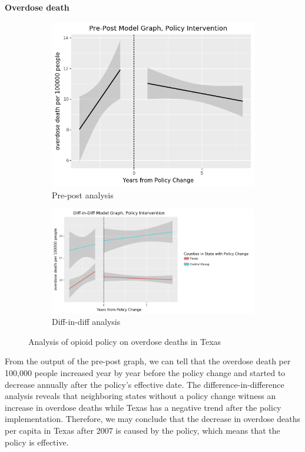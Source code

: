 \documentclass[12pt,letterpaper]{article}
\begin{document}
\noindent \textbf{Overdose death}

\begin{figure}[!h]
\centering
\begin{subfigure}{.5\textwidth}
  \centering
  \includegraphics[width=0.7\linewidth]{../30_results/General_Results/texas_overdose_death_prepost.png}
  \caption{Pre-post analysis}
  \label{fig:tx_death_prepost}
\end{subfigure}%
\begin{subfigure}{.55\textwidth}
  \centering
  \includegraphics[width=1\linewidth]{../30_results/General_Results/texas_overdose_death_diffdiff.png}
  \caption{Diff-in-diff analysis}
  \label{fig:tx_death_did}
\end{subfigure}
\caption{Analysis of opioid policy on overdose deaths in Texas}
\label{fig:tx_death}
\end{figure}

From the output of the pre-post graph, we can tell that the overdose death per 100,000 people increased year by year before the policy change and started to decrease annually after the policy's effective date. The difference-in-difference analysis reveals that neighboring states without a policy change witness an increase in overdose deaths while Texas has a negative trend after the policy implementation. Therefore, we may conclude that the decrease in overdose deaths per capita in Texas after 2007 is caused by the policy, which means that the policy is effective.
\end{document}
